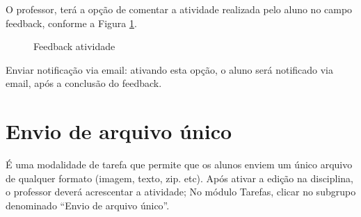 O professor, terá a opção de comentar a atividade realizada pelo aluno no campo feedback, conforme a Figura \ref{fig:cap5_34}.

\begin{figure}[!htbp]
 \begin{center}
\caption{Feedback atividade}
  \label{fig:cap5_34}
 \end{center}
\end{figure}

Enviar notificação via email: ativando esta opção, o aluno será notificado via email, após a conclusão do feedback.

\section{Envio de arquivo único}

É uma modalidade de tarefa que permite que os alunos enviem um único arquivo de qualquer formato (imagem, texto, zip. etc). Após ativar a edição na disciplina, o professor deverá acrescentar a atividade; No módulo Tarefas, clicar no subgrupo denominado “Envio de arquivo único”.

\begin{figure}[!htbp]
 \begin{center}
  \label{fig:cap5_35}
 \end{center}
\end{figure}

